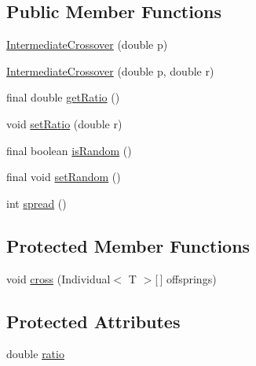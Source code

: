 \subsection*{Public Member Functions}
\begin{DoxyCompactItemize}
\item 
\hyperlink{classjenes_1_1stage_1_1operator_1_1common_1_1_intermediate_crossover_3_01_t_01extends_01_double_chromosome_01_4_a79954756cd6cd0ffc58cd4dfbee77ca3}{Intermediate\-Crossover} (double p)
\item 
\hyperlink{classjenes_1_1stage_1_1operator_1_1common_1_1_intermediate_crossover_3_01_t_01extends_01_double_chromosome_01_4_a1e108f61a2e8e654e65162ef8833441f}{Intermediate\-Crossover} (double p, double r)
\item 
final double \hyperlink{classjenes_1_1stage_1_1operator_1_1common_1_1_intermediate_crossover_3_01_t_01extends_01_double_chromosome_01_4_a5b3f99723d401833db13476b27072985}{get\-Ratio} ()
\item 
void \hyperlink{classjenes_1_1stage_1_1operator_1_1common_1_1_intermediate_crossover_3_01_t_01extends_01_double_chromosome_01_4_a1ed8c3472bcf1d00bebcb5f5e4f4988a}{set\-Ratio} (double r)
\item 
final boolean \hyperlink{classjenes_1_1stage_1_1operator_1_1common_1_1_intermediate_crossover_3_01_t_01extends_01_double_chromosome_01_4_aaed91a2488a595ef3033be9b87f7a6d1}{is\-Random} ()
\item 
final void \hyperlink{classjenes_1_1stage_1_1operator_1_1common_1_1_intermediate_crossover_3_01_t_01extends_01_double_chromosome_01_4_a7e3eb40cb2a7db9c3a80c98547cce253}{set\-Random} ()
\item 
int \hyperlink{classjenes_1_1stage_1_1operator_1_1common_1_1_intermediate_crossover_3_01_t_01extends_01_double_chromosome_01_4_a4007c5dca65a48c2ea6dfbcc2372a0b2}{spread} ()
\end{DoxyCompactItemize}
\subsection*{Protected Member Functions}
\begin{DoxyCompactItemize}
\item 
void \hyperlink{classjenes_1_1stage_1_1operator_1_1common_1_1_intermediate_crossover_3_01_t_01extends_01_double_chromosome_01_4_a712aa913c166a008a0833358270cd483}{cross} (Individual$<$ T $>$\mbox{[}$\,$\mbox{]} offsprings)
\end{DoxyCompactItemize}
\subsection*{Protected Attributes}
\begin{DoxyCompactItemize}
\item 
double \hyperlink{classjenes_1_1stage_1_1operator_1_1common_1_1_intermediate_crossover_3_01_t_01extends_01_double_chromosome_01_4_a00aeef350858cb4ee81f06f7cf7a4c06}{ratio}
\end{DoxyCompactItemize}


